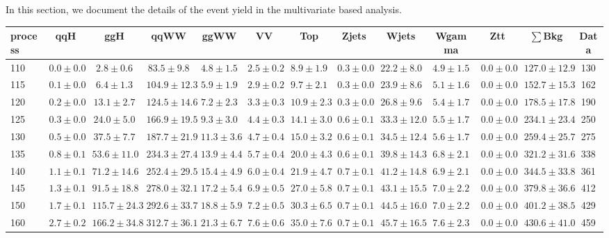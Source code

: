 In this section, we document the details of the event yield in 
the multivariate based analysis.

\begin{table}
{%
 \tiny
 \begin{center}
 \begin{tabular}{l | c c | c c c c c c c c  | c c}
 \hline
 process & qqH & ggH & qqWW & ggWW & VV & Top & Zjets & Wjets & Wgamma & Ztt & $\sum$Bkg & Data \\
 \hline
110 & $0.0\pm0.0$ & $2.8\pm0.6$ & $83.5\pm9.8$ & $4.8\pm1.5$ & $2.5\pm0.2$ & $8.9\pm1.9$ & $0.3\pm0.0$ & $22.2\pm8.0$ & $4.9\pm1.5$ & $0.0\pm0.0$ & $127.0\pm12.9$ & 130 \\
115 & $0.1\pm0.0$ & $6.4\pm1.3$ & $104.9\pm12.3$ & $5.9\pm1.9$ & $2.9\pm0.2$ & $9.7\pm2.1$ & $0.3\pm0.0$ & $23.9\pm8.6$ & $5.1\pm1.6$ & $0.0\pm0.0$ & $152.7\pm15.3$ & 162 \\
120 & $0.2\pm0.0$ & $13.1\pm2.7$ & $124.5\pm14.6$ & $7.2\pm2.3$ & $3.3\pm0.3$ & $10.9\pm2.3$ & $0.3\pm0.0$ & $26.8\pm9.6$ & $5.4\pm1.7$ & $0.0\pm0.0$ & $178.5\pm17.8$ & 190 \\
125 & $0.3\pm0.0$ & $24.0\pm5.0$ & $166.9\pm19.5$ & $9.3\pm3.0$ & $4.4\pm0.3$ & $14.1\pm3.0$ & $0.6\pm0.1$ & $33.3\pm12.0$ & $5.5\pm1.7$ & $0.0\pm0.0$ & $234.1\pm23.4$ & 250 \\
130 & $0.5\pm0.0$ & $37.5\pm7.7$ & $187.7\pm21.9$ & $11.3\pm3.6$ & $4.7\pm0.4$ & $15.0\pm3.2$ & $0.6\pm0.1$ & $34.5\pm12.4$ & $5.6\pm1.7$ & $0.0\pm0.0$ & $259.4\pm25.7$ & 275 \\
135 & $0.8\pm0.1$ & $53.6\pm11.0$ & $234.3\pm27.4$ & $13.9\pm4.4$ & $5.7\pm0.4$ & $20.0\pm4.3$ & $0.6\pm0.1$ & $39.8\pm14.3$ & $6.8\pm2.1$ & $0.0\pm0.0$ & $321.2\pm31.6$ & 338 \\
140 & $1.1\pm0.1$ & $71.2\pm14.6$ & $252.4\pm29.5$ & $15.4\pm4.9$ & $6.0\pm0.4$ & $21.9\pm4.7$ & $0.7\pm0.1$ & $41.2\pm14.8$ & $6.9\pm2.1$ & $0.0\pm0.0$ & $344.5\pm33.8$ & 361 \\
145 & $1.3\pm0.1$ & $91.5\pm18.8$ & $278.0\pm32.1$ & $17.2\pm5.4$ & $6.9\pm0.5$ & $27.0\pm5.8$ & $0.7\pm0.1$ & $43.1\pm15.5$ & $7.0\pm2.2$ & $0.0\pm0.0$ & $379.8\pm36.6$ & 412 \\
150 & $1.7\pm0.1$ & $115.7\pm24.3$ & $292.6\pm33.7$ & $18.8\pm5.9$ & $7.2\pm0.5$ & $30.3\pm6.5$ & $0.7\pm0.1$ & $44.5\pm16.0$ & $7.0\pm2.2$ & $0.0\pm0.0$ & $401.2\pm38.5$ & 429 \\
160 & $2.7\pm0.2$ & $166.2\pm34.8$ & $312.7\pm36.1$ & $21.3\pm6.7$ & $7.6\pm0.6$ & $35.0\pm7.6$ & $0.7\pm0.1$ & $45.7\pm16.5$ & $7.6\pm2.3$ & $0.0\pm0.0$ & $430.6\pm41.0$ & 459 \\

\end{tabular}
\end{center}}
\end{table}
